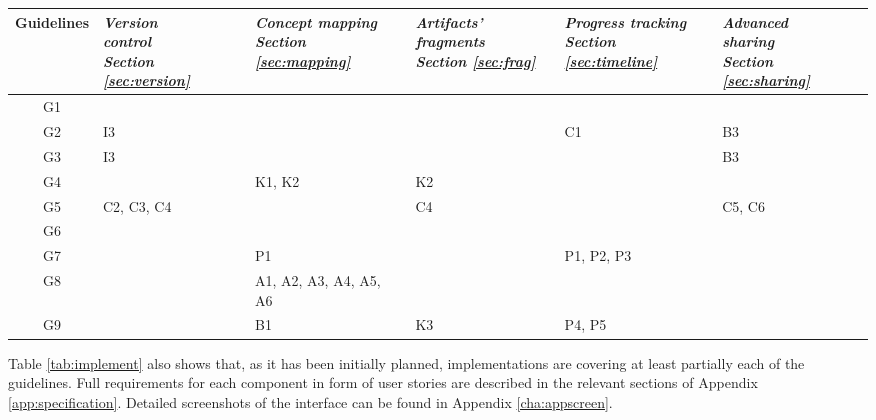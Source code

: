 \begin{center} \small
    \tablelasttail{\hline} 
    \begin{supertabular}{| c || p{2cm} | p{2cm} | p{2cm} | p{2cm} | p{2cm} |}
     \textbf{Guidelines} & 
     \textit{Version \newline control \newline Section \ref{sec:version}} & 
     \textit{Concept mapping \newline Section \ref{sec:mapping}} & 
     \textit{Artifacts' fragments \newline Section \ref{sec:frag}} & 
     \textit{Progress tracking \newline Section \ref{sec:timeline}} & 
     \textit{Advanced \newline sharing \newline Section \ref{sec:sharing}} \\
     \hline \hline
      G1 & & & & & \\ \hline
     G2 & I3 & & & C1 & B3\\ \hline
     G3 & I3 & & & & B3 \\ \hline
     G4 & & K1, K2 & K2 & & \\ \hline
     G5 & C2, C3, C4 & & C4 & & C5, C6 \\ \hline
      G6 & & & & & \\ \hline
     G7 & & P1 & & P1, P2, P3 & \\ \hline
     G8 & & A1, A2, A3, \newline A4, A5, A6 & & & \\ \hline
     G9 & & B1 & K3 & P4, P5 & \\ \hline
    \end{supertabular}
    \label{tab:implement}
\end{center}

Table \ref{tab:implement} also shows that, as it has been initially planned,
implementations are covering at least partially each of the guidelines. Full
requirements for each component in form of user stories are described in the
relevant sections of Appendix \ref{app:specification}. Detailed screenshots
of the interface can be found in Appendix \ref{cha:appscreen}.

